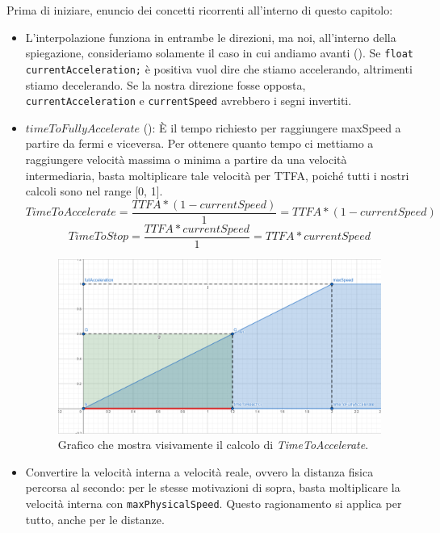 \documentclass[main.tex]{subfiles}
\begin{document}
Prima di iniziare, enuncio dei concetti ricorrenti all'interno di questo capitolo:
\begin{itemize}
    \item L'interpolazione funziona in entrambe le direzioni, ma noi, all'interno della spiegazione, consideriamo solamente il caso in cui andiamo avanti (). Se \lstinline{float currentAcceleration;} è positiva vuol dire che stiamo accelerando, altrimenti stiamo decelerando. Se la nostra direzione fosse opposta, \lstinline{currentAcceleration} e \lstinline{currentSpeed} avrebbero i segni invertiti.
    \item $timeToFullyAccelerate$ (): È il tempo richiesto per raggiungere maxSpeed a partire da fermi e viceversa. Per ottenere quanto tempo ci mettiamo a raggiungere velocità massima o minima a partire da una velocità intermediaria, basta moltiplicare tale velocità per TTFA, poiché tutti i nostri calcoli sono nel range [0, 1].
    \[TimeToAccelerate = \frac{TTFA * (1 - currentSpeed)}{1} = TTFA * (1 - currentSpeed)\]
    \[TimeToStop = \frac{TTFA * currentSpeed}{1} = TTFA * currentSpeed\]
    \begin{figure}[H]
        \centering
        \includegraphics[width=.65\linewidth]{img/interpolazione/timeToFullyAccelerate.png}
        \caption{Grafico che mostra visivamente il calcolo di \textit{TimeToAccelerate}.}
        \label{fig:4_timeToFullyAccelerate}
    \end{figure}
    \item Convertire la velocità interna a velocità reale, ovvero la distanza fisica percorsa al secondo: per le stesse motivazioni di sopra, basta moltiplicare la velocità interna con \lstinline{maxPhysicalSpeed}. Questo ragionamento si applica per tutto, anche per le distanze.
\end{itemize}
\end{document}
